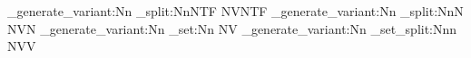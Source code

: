 \cs_generate_variant:Nn \regex_split:NnNTF {NVNTF}
\cs_generate_variant:Nn \regex_split:NnN {NVN}
\cs_generate_variant:Nn \regex_set:Nn {NV}
\cs_generate_variant:Nn \seq_set_split:Nnn { NVV }
